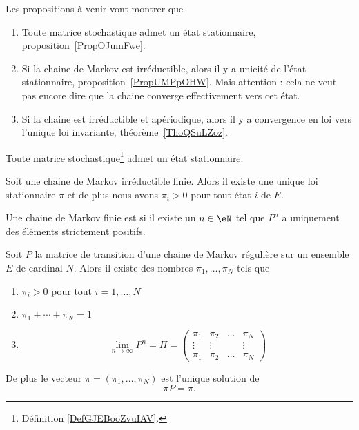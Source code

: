 Les propositions à venir vont montrer que
\begin{enumerate}
	\item
	      Toute matrice stochastique admet un état stationnaire, proposition~\ref{PropOJumFwe}.
	\item
	      Si la chaine de Markov est irréductible, alors il y a unicité de l'état stationnaire, proposition~\ref{PropUMPpOHW}. Mais attention : cela ne veut pas encore dire que la chaine converge effectivement vers cet état.
	\item
	      Si la chaine est irréductible et apériodique, alors il y a convergence en loi vers l'unique loi invariante, théorème~\ref{ThoQSuLZoz}.
\end{enumerate}

\begin{proposition} \label{PropOJumFwe}
    Toute matrice stochastique\footnote{Définition \ref{DefGJEBooZvuIAV}.} admet un état stationnaire.
\end{proposition}

\begin{proposition}     \label{PropUMPpOHW}
	Soit une chaine de Markov irréductible finie. Alors il existe une unique loi stationnaire \( \pi\) et de plus nous avons \( \pi_i>0\) pour tout état \( i\) de \( E\).
\end{proposition}

\begin{definition}
	Une chaine de Markov finie est  si il existe un \( n\in \eN\) tel que \( P^n\) a uniquement des éléments strictement positifs.
\end{definition}

\begin{theorem}
	Soit \( P\) la matrice de transition d'une chaine de Markov régulière sur un ensemble \( E\) de cardinal \( N\). Alors il existe des nombres \( \pi_1,\ldots, \pi_N\) tels que
	\begin{enumerate}
		\item
		      \( \pi_i>0\) pour tout \( i=1,\ldots, N\)
		\item
		      \( \pi_1+\cdots +\pi_N=1\)
		\item
		      \begin{equation}
			      \lim_{n\to \infty} P^n=\Pi=\begin{pmatrix}
				      \pi_1  & \pi_2  & \ldots & \pi_N  \\
				      \vdots & \vdots &        & \vdots \\
				      \pi_1  & \pi_2  & \ldots & \pi_N
			      \end{pmatrix}
		      \end{equation}
	\end{enumerate}
	De plus le vecteur \( \pi=(\pi_1,\ldots, \pi_N)\) est l'unique solution de
	\begin{equation}
		\pi P=\pi.
	\end{equation}
\end{theorem}

